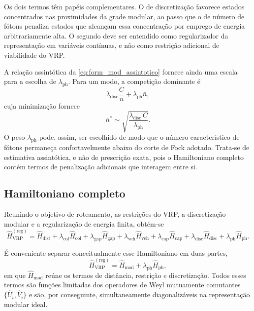         Os dois termos têm papéis complementares. O de discretização favorece estados concentrados nas proximidades da grade modular, ao passo que o de número de fótons penaliza estados que alcançam essa concentração por emprego de energia arbitrariamente alta. O segundo deve ser entendido como regularizador da representação em variáveis contínuas, e não como restrição adicional de viabilidade do VRP.

        A relação assintótica da \autoref{eq:form_mod_assintotico} fornece ainda uma escala para a escolha de $\lambda_{\text{ph}}$. Para um modo, a competição dominante é
        \begin{equation}\label{eq:form_mod_competicao}
            \lambda_{\text{disc}} \frac{C}{\bar{n}} + \lambda_{\text{ph}} \bar{n} ,
        \end{equation}
        \noindent cuja minimização fornece
        \begin{equation}\label{eq:form_mod_nstar}
            \bar{n}^{*} \sim \sqrt{\frac{\lambda_{\text{disc}}\, C}{\lambda_{\text{ph}}}} .
        \end{equation}
        \noindent O peso $\lambda_{\text{ph}}$ pode, assim, ser escolhido de modo que o número característico de fótons permaneça confortavelmente abaixo do corte de Fock adotado. Trata-se de estimativa assintótica, e não de prescrição exata, pois o Hamiltoniano completo contém termos de penalização adicionais que interagem entre si.

    \subsection{Hamiltoniano completo}\label{subsec:form_mod_hamiltoniano}

        Reunindo o objetivo de roteamento, as restrições do VRP, a discretização modular e a regularização de energia finita, obtém-se
        \begin{equation}\label{eq:form_mod_total}
            \hat{H}_{\text{VRP}}^{(\text{reg})} = \hat{H}_{\text{dist}}
            + \lambda_{\text{col}} \hat{H}_{\text{col}}
            + \lambda_{\text{gap}} \hat{H}_{\text{gap}}
            + \lambda_{\text{veh}} \hat{H}_{\text{veh}}
            + \lambda_{\text{cap}} \hat{H}_{\text{cap}}
            + \lambda_{\text{disc}} \hat{H}_{\text{disc}}
            + \lambda_{\text{ph}} \hat{H}_{\text{ph}} .
        \end{equation}

        É conveniente separar conceitualmente esse Hamiltoniano em duas partes,
        \begin{equation}\label{eq:form_mod_separacao}
            \hat{H}_{\text{VRP}}^{(\text{reg})} = \hat{H}_{\text{mod}}
            + \lambda_{\text{ph}} \hat{H}_{\text{ph}} ,
        \end{equation}
        \noindent em que $\hat{H}_{\text{mod}}$ reúne os termos de distância, restrição e discretização. Todos esses termos são funções limitadas dos operadores de Weyl mutuamente comutantes $\{\hat{U}_i, \hat{V}_i\}$ e são, por conseguinte, simultaneamente diagonalizáveis na representação modular ideal.

